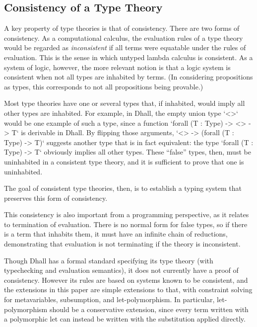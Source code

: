 \documentclass[11pt, twoside, reqno]{book}
\begin{document}
\subsection{Consistency of a Type Theory}

A key property of type theories is that of consistency.
There are two forms of consistency.
As a computational calculus, the evaluation rules of a type theory would be regarded as \emph{inconsistent} if all terms were equatable under the rules of evaluation.
This is the sense in which untyped lambda calculus is consistent.
As a system of logic, however, the more relevant notion is that a logic system is consistent when not all types are inhabited by terms.
(In considering propositions as types, this corresponds to not all propositions being provable.)

Most type theories have one or several types that, if inhabited, would imply all other types are inhabited.
For example, in Dhall, the empty union type \inHS`<>` would be one example of such a type, since a function \inHS`forall (T : Type) -> <> -> T` is derivable in Dhall.
By flipping those arguments, \inHS`<> -> (forall (T : Type) -> T)` suggests another type that is in fact equivalent: the type \inHS`forall (T : Type) -> T` obviously implies all other types.
These ``false'' types, then, must be uninhabited in a consistent type theory, and it is sufficient to prove that one is uninhabited.

The goal of consistent type theories, then, is to establish a typing system that preserves this form of consistency.

This consistency is also important from a programming perspective, as it relates to termination of evaluation.
There is no normal form for false types, so if there is a term that inhabits them, it must have an infinite chain of reductions, demonstrating that evaluation is not terminating if the theory is inconsistent.

Though Dhall has a formal standard specifying its type theory (with typechecking and evaluation semantics), it does not currently have a proof of consistency.
However its rules are based on systems known to be consistent, and the extensions in this paper are simple extensions to that, with constraint solving for metavariables, subsumption, and let-polymorphism.
In particular, let-polymorphism should be a conservative extension, since every term written with a polymorphic let can instead be written with the substitution applied directly.

\end{document}
